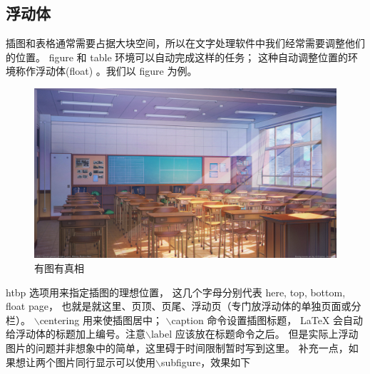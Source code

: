 \documentclass{thesis}
\begin{document}
\subsection{浮动体}
插图和表格通常需要占据大块空间，所以在文字处理软件中我们经常需要调整他们的位置。
figure 和 table 环境可以自动完成这样的任务；
这种自动调整位置的环境称作浮动体(float) 。我们以 figure 为例。
\begin{figure}[htbp]
    \centering
    \includegraphics[width = .8\textwidth]{classroom.png}
    \caption{有图有真相}
    \label{fig:myphoto}
\end{figure}
htbp 选项用来指定插图的理想位置，
这几个字母分别代表 here, top, bottom, float page，
也就是就这里、页顶、页尾、浮动页（专门放浮动体的单独页面或分栏）。
$\backslash$centering 用来使插图居中；
$\backslash$caption 命令设置插图标题，
LaTeX 会自动给浮动体的标题加上编号。注意$\backslash$label 应该放在标题命令之后。
但是实际上浮动图片的问题并非想象中的简单，这里碍于时间限制暂时写到这里。
补充一点，如果想让两个图片同行显示可以使用$\backslash$subfigure，效果如下
\end{document}
